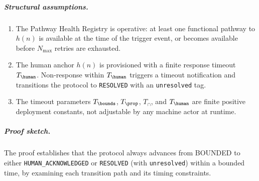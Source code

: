 \subparagraph{Structural assumptions.}
\begin{enumerate}
\item[\textbf{A2.1}] The Pathway Health Registry is operative: at least one functional pathway to $h(n)$ is available at the time of the trigger event, or becomes available before $N_{\max}$ retries are exhausted.
\item[\textbf{A2.2}] The human anchor $h(n)$ is provisioned with a finite response timeout $T_{\human}$. Non-response within $T_{\human}$ triggers a timeout notification and transitions the protocol to \texttt{RESOLVED} with an \texttt{unresolved} tag.
\item[\textbf{A2.3}] The timeout parameters $T_{\bounds}$, $T_{\prop}$, $T_{\cap}$, and $T_{\human}$ are finite positive deployment constants, not adjustable by any machine actor at runtime.
\end{enumerate}

\subparagraph{Proof sketch.} The proof establishes that the protocol always advances from BOUNDED to either \texttt{HUMAN\_ACKNOWLEDGED} or \texttt{RESOLVED} (with \texttt{unresolved}) within a bounded time, by examining each transition path and its timing constraints.

